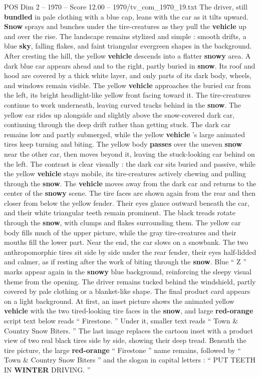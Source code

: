 \begin{textsample}{POS Dim 2 – 1970 – Score 12.00 – 1970/tv\_com\_1970\_19.txt}
The driver, still \textbf{bundled} in pale clothing with a blue cap, leans with the car as it tilts upward. \textbf{Snow} sprays and bunches under the tire-creatures as they pull the \textbf{vehicle} up and over the rise.
The landscape remains stylized and simple : smooth drifts, a blue \textbf{sky}, falling flakes, and faint triangular evergreen shapes in the background.
After cresting the hill, the yellow \textbf{vehicle} descends into a flatter \textbf{snowy} area.
A dark blue car appears ahead and to the right, partly buried in \textbf{snow}.
Its roof and hood are covered by a thick white layer, and only parts of its dark body, wheels, and windows remain visible.
The yellow \textbf{vehicle} approaches the buried car from the left, its bright headlight-like yellow front facing toward it.
The tire-creatures continue to work underneath, leaving curved tracks behind in the \textbf{snow}.
The yellow car rides up alongside and slightly above the snow-covered dark car, continuing through the deep drift rather than getting stuck.
The dark car remains low and partly submerged, while the yellow \textbf{vehicle} ’s large animated tires keep turning and biting.
The yellow body \textbf{passes} over the uneven \textbf{snow} near the other car, then moves beyond it, leaving the stuck-looking car behind on the left.
The contrast is clear visually : the dark car sits buried and passive, while the yellow \textbf{vehicle} stays mobile, its tire-creatures actively chewing and pulling through the \textbf{snow}.
The \textbf{vehicle} moves away from the dark car and returns to the center of the \textbf{snowy} scene.
The tire faces are shown again from the rear and then closer from below the yellow fender.
Their eyes glance outward beneath the car, and their white triangular teeth remain prominent.
The black treads rotate through the \textbf{snow}, with clumps and flakes surrounding them.
The yellow car body fills much of the upper picture, while the gray tire-creatures and their mouths fill the lower part.
Near the end, the car slows on a snowbank.
The two anthropomorphic tires sit side by side under the rear fender, their eyes half-lidded and calmer, as if resting after the work of biting through the \textbf{snow}.
Blue “ Z ” marks appear again in the \textbf{snowy} blue background, reinforcing the sleepy visual theme from the opening.
The driver remains tucked behind the windshield, partly covered by pale clothing or a blanket-like shape.
The final product card appears on a light background.
At first, an inset picture shows the animated yellow \textbf{vehicle} with the two tired-looking tire faces in the \textbf{snow}, and large \textbf{red-orange} script text below reads “ Firestone. ” Under it, smaller text reads “ Town \& Country Snow Biters. ” The last image replaces the cartoon inset with a product view of two real black tires side by side, showing their deep tread.
Beneath the tire picture, the large \textbf{red-orange} “ Firestone ” name remains, followed by “ Town \& Country Snow Biters ” and the slogan in capital letters : “ PUT TEETH IN \textbf{WINTER} DRIVING. ”

\end{textsample}
